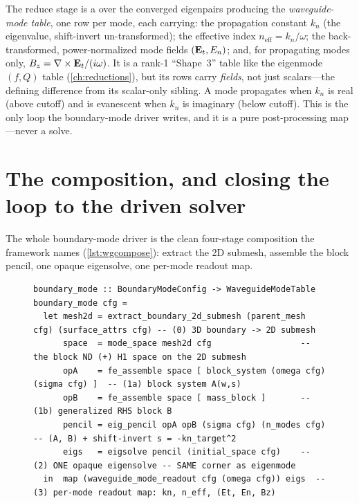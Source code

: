 \begin{keyidea}
The reduce stage is a  over the converged eigenpairs producing the
\emph{waveguide-mode table}, one row per mode, each carrying: the propagation
constant $k_n$ (the eigenvalue, shift-invert un-transformed); the effective index
$n_\text{eff}=k_n/\omega$; the back-transformed, power-normalized mode fields
$(\mathbf{E}_t,E_n)$; and, for propagating modes only, $B_z=\nabla\times\mathbf{E}_t/(i\omega)$. It is a
rank-1 ``Shape~3'' table like the eigenmode $(f,Q)$ table (\cref{ch:reductions}),
but its rows carry \emph{fields}, not just scalars---the defining difference from
its scalar-only sibling. A mode propagates when $k_n$ is real (above cutoff) and is
evanescent when $k_n$ is imaginary (below cutoff). This is the only loop the
boundary-mode driver writes, and it is a pure post-processing map---never a solve.
\end{keyidea}

\section{The composition, and closing the loop to the driven solver}
\label{sec:compose}

The whole boundary-mode driver is the clean four-stage composition the framework
names (\cref{lst:wgcompose}): extract the 2D submesh, assemble the block pencil,
one opaque eigensolve, one per-mode readout map.

\begin{figure}[t]
\begin{lstlisting}[style=l4style, caption={[The boundary-mode composition]The
boundary-mode feature as a composition of firm vocabulary. Stage~0 extracts the 2D
submesh from the named 3D boundary faces---the one new idea. Stages~1--3 are the
eigenmode pipeline of \cref{ch:eigenmodes}: assemble the block
$\Hcurl\oplus\Hone$ pencil, hand it to the opaque \texttt{eigsolve} once, and
\texttt{map} the per-mode readout over the converged modes. The only
Palace-written loop is the final \texttt{map}.}, label={lst:wgcompose}]
boundary_mode :: BoundaryModeConfig -> WaveguideModeTable
boundary_mode cfg =
  let mesh2d = extract_boundary_2d_submesh (parent_mesh cfg) (surface_attrs cfg) -- (0) 3D boundary -> 2D submesh
      space  = mode_space mesh2d cfg                  -- the block ND (+) H1 space on the 2D submesh
      opA    = fe_assemble space [ block_system (omega cfg) (sigma cfg) ]  -- (1a) block system A(w,s)
      opB    = fe_assemble space [ mass_block ]       -- (1b) generalized RHS block B
      pencil = eig_pencil opA opB (sigma cfg) (n_modes cfg)  -- (A, B) + shift-invert s = -kn_target^2
      eigs   = eigsolve pencil (initial_space cfg)    -- (2) ONE opaque eigensolve -- SAME corner as eigenmode
  in  map (waveguide_mode_readout cfg (omega cfg)) eigs  -- (3) per-mode readout map: kn, n_eff, (Et, En, Bz)
\end{lstlisting}
\end{figure}

